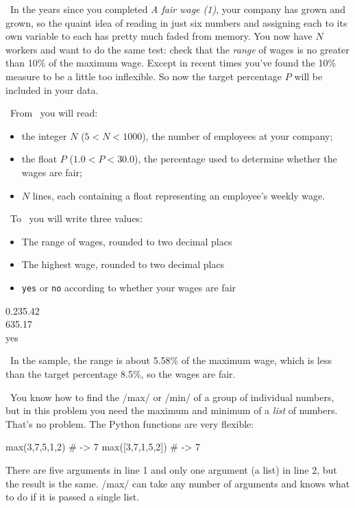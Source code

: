 

\Question\ In the years since you completed \emph{A fair wage (1)}, your company has
grown and grown, so the quaint idea of reading in just six numbers and assigning each to
its own variable to each has pretty much faded from memory. You now have $N$ workers and
want to do the same test: check that the \emph{range} of wages is no greater than 10\% of
the maximum wage. Except in recent times you've found the 10\% measure to be a little too
inflexible. So now the target percentage $P$ will be included in your data.

\Input\ From \IN\ you will read:
\begin{itemize}
  \item the integer $N$ ($5 < N < 1000$), the number of employees at your company;
  \item the float $P$ ($1.0 < P < 30.0$), the percentage used to determine whether the
    wages are fair;
  \item $N$ lines, each containing a float representing an employee's weekly wage.
\end{itemize}

\Output\ To \OUT\ you will write three values:
\begin{itemize}
  \item The range of wages, rounded to two decimal placs
  \item The highest wage, rounded to two decimal placs
  \item \texttt{yes} or \texttt{no} according to whether your wages are fair
\end{itemize}

\Sample

       {0.2}{35.42\\635.17\\yes}

\Explanation\ In the sample, the range is about 5.58\% of the maximum wage, which is less
than the target percentage 8.5\%, so the wages are fair.

\Scratch\ You know how to find the \pycode/max/ or \pycode/min/ of a group of individual
numbers, but in this problem you need the maximum and minimum of a \emph{list} of numbers.
That's no problem. The Python functions are very flexible:
\begin{pythoncode} 
  max(3,7,5,1,2)           # -> 7
  max([3,7,1,5,2])         # -> 7
\end{pythoncode}

There are five arguments in line 1 and only one argument (a list) in line 2, but the
result is the same. \pycode/max/ can take any number of arguments and knows what to
do if it is passed a single list.

